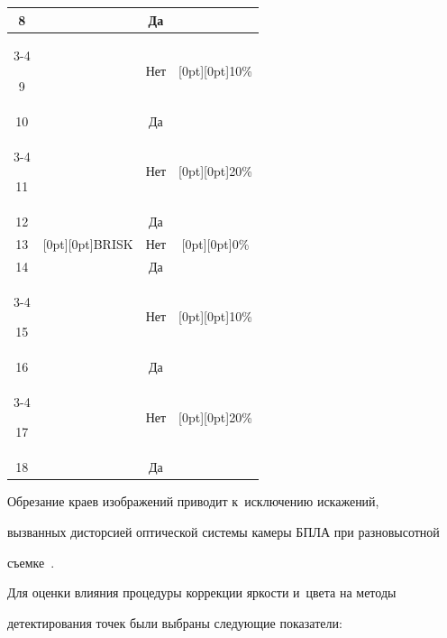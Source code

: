 \begin{table}
\begin{center}
\begin{tabular}{|c|c|c|c|}
\hphantom{9}8&&Да&\\


\cline{3-4}


\hphantom{9}9&&Нет&\raisebox{-6pt}[0pt][0pt]{10\%}\\


10&&Да&\\


\cline{3-4}


11&&Нет&\raisebox{-6pt}[0pt][0pt]{20\%}\\


12&&Да&\\


\hline


13&\multicolumn{1}{c|}{\raisebox{-28pt}[0pt][0pt]{BRISK}}&Нет&\raisebox{-6pt}[0pt][0pt]{\hphantom{9}0\%}\\


14&&Да&\\


\cline{3-4}


15&&Нет&\raisebox{-6pt}[0pt][0pt]{10\%}\\


16&&Да&\\


\cline{3-4}


17&&Нет&\raisebox{-6pt}[0pt][0pt]{20\%}\\


18&&Да&\\


\hline


\end{tabular}


\end{center}


\end{table}


  


  Обрезание краев изображений приводит к~исключению искажений, 


вызванных дис\-тор\-си\-ей оптической сис\-те\-мы камеры БПЛА при разновысотной 


съемке~\cite{15-arh}.


  


  Для оценки влияния процедуры коррекции яр\-кости и~цвета на методы 


детектирования точек были вы\-бра\-ны сле\-ду\-ющие показатели:


